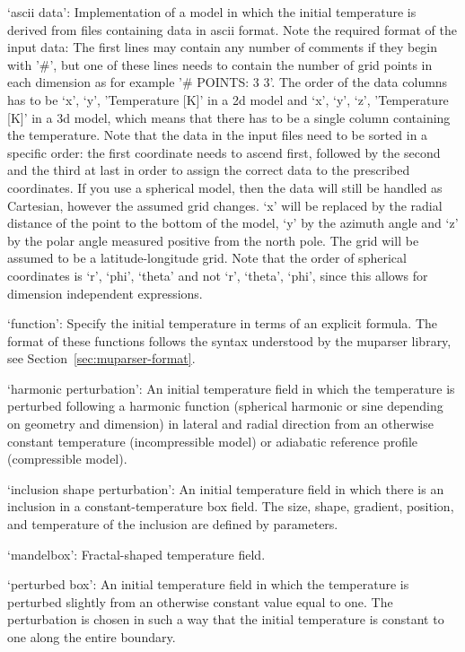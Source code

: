 \begin{itemize}
`ascii data': Implementation of a model in which the initial temperature is derived from files containing data in ascii format. Note the required format of the input data: The first lines may contain any number of comments if they begin with '\#', but one of these lines needs to contain the number of grid points in each dimension as for example '\# POINTS: 3 3'. The order of the data columns has to be `x', `y', 'Temperature [K]' in a 2d model and  `x', `y', `z', 'Temperature [K]' in a 3d model, which means that there has to be a single column containing the temperature. Note that the data in the input files need to be sorted in a specific order: the first coordinate needs to ascend first, followed by the second and the third at last in order to assign the correct data to the prescribed coordinates. If you use a spherical model, then the data will still be handled as Cartesian, however the assumed grid changes. `x' will be replaced by the radial distance of the point to the bottom of the model, `y' by the azimuth angle and `z' by the polar angle measured positive from the north pole. The grid will be assumed to be a latitude-longitude grid. Note that the order of spherical coordinates is `r', `phi', `theta' and not `r', `theta', `phi', since this allows for dimension independent expressions.

`function': Specify the initial temperature in terms of an explicit formula. The format of these functions follows the syntax understood by the muparser library, see Section~\ref{sec:muparser-format}.

`harmonic perturbation': An initial temperature field in which the temperature is perturbed following a harmonic function (spherical harmonic or sine depending on geometry and dimension) in lateral and radial direction from an otherwise constant temperature (incompressible model) or adiabatic reference profile (compressible model).

`inclusion shape perturbation': An initial temperature field in which there is an inclusion in a constant-temperature box field. The size, shape, gradient, position, and temperature of the inclusion are defined by parameters.

`mandelbox': Fractal-shaped temperature field.

`perturbed box': An initial temperature field in which the temperature is perturbed slightly from an otherwise constant value equal to one. The perturbation is chosen in such a way that the initial temperature is constant to one along the entire boundary.


\end{itemize}
